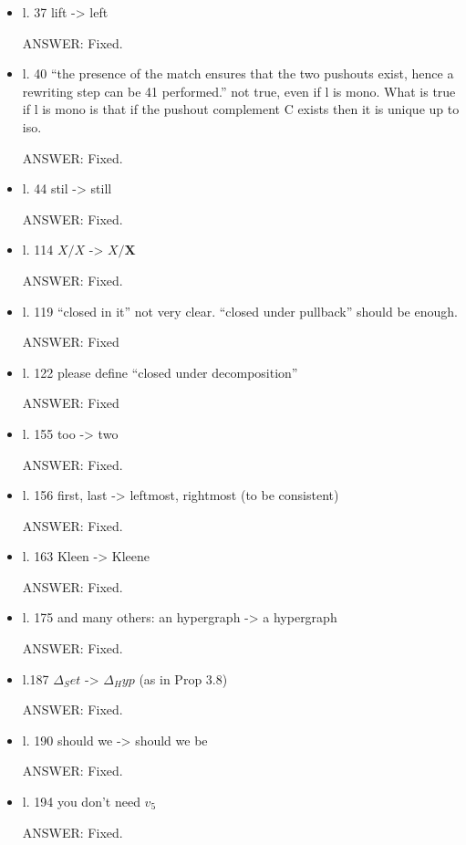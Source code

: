 \documentclass[english,11pt,a4paper]{article}
\begin{document}
\begin{itemize}
\item l. 37 lift -> left

ANSWER: Fixed.

\item l. 40 ``the presence of the match ensures that the two pushouts exist, hence a rewriting step can be 41 performed.'' not true, even if l is mono. What is true if l is mono is that if the pushout complement C
exists then it is unique up to iso.

ANSWER: Fixed.

\item l. 44 stil -> still

ANSWER: Fixed.

\item l. 114 $X/X$ -> $X/\mathbf{X}$

ANSWER: Fixed.

\item l. 119 ``closed in it'' not very clear. ``closed under pullback'' should be enough.

ANSWER: Fixed

\item l. 122 please define ``closed under decomposition''

ANSWER: Fixed

\item l. 155 too -> two

ANSWER: Fixed.

\item l. 156 first, last -> leftmost, rightmost (to be consistent)

ANSWER: Fixed.

\item l. 163 Kleen -> Kleene

ANSWER: Fixed.

\item l. 175 and many others: an hypergraph -> a hypergraph

ANSWER: Fixed.

\item l.187 $\Delta_Set$ -> $\Delta_Hyp$ (as in Prop 3.8)

ANSWER: Fixed.

\item l. 190 should we -> should we be

ANSWER: Fixed.

\item l. 194 you don't need $v_5$

ANSWER: Fixed.


\end{itemize}
\end{document}
